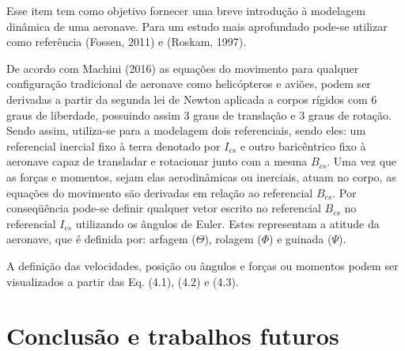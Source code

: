 \documentclass[10pt,a4paper]{article}
\numberwithin{equation}{section}
\begin{document}
\par Esse item tem como objetivo fornecer uma breve introdução à modelagem dinâmica de uma aeronave. Para um estudo mais aprofundado pode-se utilizar como referência (Fossen, 2011) e (Roskam, 1997).
\par De acordo com Machini (2016) as equações do movimento para qualquer configuração tradicional de aeronave como helicópteros e aviões, podem ser derivadas a partir da segunda lei de Newton aplicada a corpos rígidos com 6 graus de liberdade, possuindo assim 3 graus de translação e 3 graus de rotação. Sendo assim, utiliza-se para a modelagem dois referenciais, sendo eles: um referencial inercial fixo à terra denotado por $I_{cs}$ e outro baricêntrico fixo à aeronave capaz de transladar e rotacionar junto com a mesma $B_{cs}$.  Uma vez que as forças e momentos, sejam elas aerodinâmicas ou inerciais, atuam no corpo, as equações do movimento são derivadas em relação ao referencial $B_{cs}$. Por conseqüência pode-se definir qualquer vetor escrito no referencial $B_{cs}$ no referencial $I_{cs}$ utilizando os ângulos de Euler. Estes representam a atitude da aeronave, que é definida por: arfagem ($\Theta$), rolagem ($\Phi$) e guinada ($\Psi$).
\par A definição das velocidades, posição ou ângulos e forças ou momentos podem ser visualizados a partir das Eq. (4.1), (4.2) e (4.3).


\newpage
\section{Conclusão e trabalhos futuros}
\end{document}
